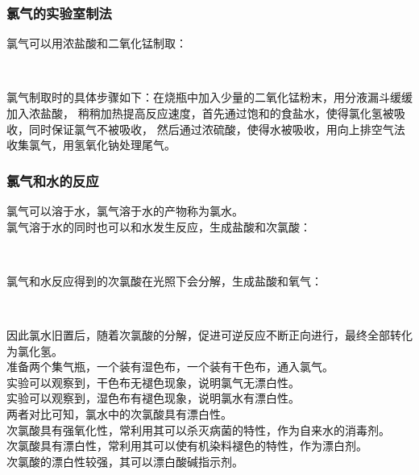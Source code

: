 \documentclass[UTF8]{ctexart}
\begin{document}
\newpage

\subsubsection{氯气的实验室制法}
    氯气可以用浓盐酸和二氧化锰制取：
    \begin{center}
        \\[6mm]
    \end{center}
    氯气制取时的具体步骤如下：在烧瓶中加入少量的二氧化锰粉末，用分液漏斗缓缓加入浓盐酸，
    稍稍加热提高反应速度，首先通过饱和的食盐水，使得氯化氢被吸收，同时保证氯气不被吸收，
    然后通过浓硫酸，使得水被吸收，用向上排空气法收集氯气，用氢氧化钠处理尾气。

\subsubsection{氯气和水的反应}
    氯气可以溶于水，氯气溶于水的产物称为氯水。\\[3mm]
    氯气溶于水的同时也可以和水发生反应，生成盐酸和次氯酸：
    \begin{center}
        \\[6mm]
    \end{center}
    氯气和水反应得到的次氯酸在光照下会分解，生成盐酸和氧气：
    \begin{center}
        \\[6mm]
    \end{center}
    因此氯水旧置后，随着次氯酸的分解，促进可逆反应不断正向进行，最终全部转化为氯化氢。\\[6mm]
    准备两个集气瓶，一个装有湿色布，一个装有干色布，通入氯气。\\[3mm]
    实验可以观察到，干色布无褪色现象，说明氯气无漂白性。\\[3mm]
    实验可以观察到，湿色布有褪色现象，说明氯水有漂白性。\\[3mm]
    两者对比可知，氯水中的次氯酸具有漂白性。\\[6mm]
    次氯酸具有强氧化性，常利用其可以杀灭病菌的特性，作为自来水的消毒剂。\\[3mm]
    次氯酸具有漂白性，常利用其可以使有机染料褪色的特性，作为漂白剂。\\[3mm]
    次氯酸的漂白性较强，其可以漂白酸碱指示剂。

\newpage
\end{document}
